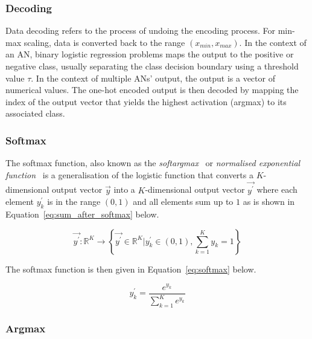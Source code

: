 \subsubsection{Decoding}\label{sec:anns:an:output:decoding}

Data decoding refers to the process of undoing the encoding process. For min-max scaling, data is converted back to the range $(x_{min}, x_{max})$. In the context of an \acs{AN}, binary logistic regression problems maps the output to the positive or negative class, usually separating the class decision boundary using a threshold value $\tau$. In the context of multiple \acp{AN}' output, the output is a vector of numerical values. The one-hot encoded output is then decoded by mapping the index of the output vector that yields the highest activation (argmax) to its associated class.

\subsubsection{Softmax}\label{sec:anns:an:output:softmax}

The softmax function, also known as the \textit{softargmax}~\cite[p.~184]{ref:goodfellow:2016} or \textit{normalised exponential function}~\cite{ref:bishop:2006} is a generalisation of the logistic function that converts a $K$-dimensional output vector $\vec{y}$ into a $K$-dimensional output vector $\vec{y^{'}}$ where each element $y^{'}_k$ is in the range $(0,1)$ and all elements sum up to $1$ as is shown in Equation~\eqref{eq:sum_after_softmax} below.

\begin{equation}
      \vec{y^{'}} \colon \mathbb{R}^{K} \to \left\{\vec{y^{'}} \in \mathbb{R}^{K} \vert y^{'}_k \in (0,1), \sum_{k=1}^{K} y_k = 1\right\}
      \label{eq:sum_after_softmax}
\end{equation}

\noindent
The softmax function is then given in Equation~\eqref{eq:softmax} below.

\begin{equation}
      y^{'}_k = \frac{e^{y_k}}{\sum_{k = 1}^{K}e^{y_k}}
      \label{eq:softmax}
\end{equation}


\subsubsection{Argmax}\label{sec:anns:an:output:argmax}

